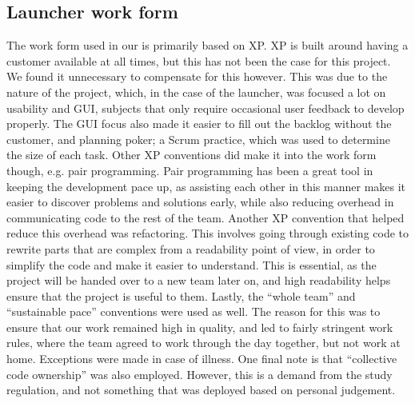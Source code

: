 \subsection{Launcher work form}
The work form used in our \localgroup{} is primarily based on XP. 
XP is built around having a customer available at all times, but this has not been the case for this project. 
We found it unnecessary to compensate for this however. 
This was due to the nature of the project, which, in the case of the launcher, was focused a lot on usability and GUI, subjects that only require occasional user feedback to develop properly.
The GUI focus also made it easier to fill out the backlog without the customer, and planning poker; a Scrum practice, which was used to determine the size of each task. \newline
Other XP conventions did make it into the work form though, e.g. pair programming. 
Pair programming has been a great tool in keeping the development pace up, as assisting each other in this manner makes it easier to discover problems and solutions early, while also reducing overhead in communicating code to the rest of the team. \newline
Another XP convention that helped reduce this overhead was refactoring. 
This involves going through existing code to rewrite parts that are complex from a readability point of view, in order to simplify the code and make it easier to understand. 
This is essential, as the project will be handed over to a new team later on, and high readability helps ensure that the project is useful to them. \newline
Lastly, the \textquotedblleft{}whole team\textquotedblright{} and \textquotedblleft{}sustainable pace\textquotedblright{} conventions were used as well. 
The reason for this was to ensure that our work remained high in quality, and led to fairly stringent work rules, where the team agreed to work through the day together, but not work at home. 
Exceptions were made in case of illness. \newline
One final note is that \textquotedblleft{}collective code ownership\textquotedblright{} was also employed. 
However, this is a demand from the study regulation, and not something that was deployed based on personal judgement.

